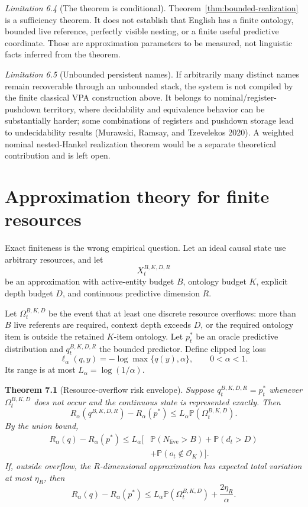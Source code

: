 \documentclass[11pt]{article}
\begin{document}
\emph{Limitation 6.4} (The theorem is conditional). Theorem~\ref{thm:bounded-realization} is a sufficiency theorem. It does not establish that English has a finite ontology, bounded live reference, perfectly visible nesting, or a finite useful predictive coordinate. Those are approximation parameters to be measured, not linguistic facts inferred from the theorem.

\emph{Limitation 6.5} (Unbounded persistent names). If arbitrarily many distinct names remain recoverable through an unbounded stack, the system is not compiled by the finite classical VPA construction above. It belongs to nominal/register-pushdown territory, where decidability and equivalence behavior can be substantially harder; some combinations of registers and pushdown storage lead to undecidability results (Murawski, Ramsay, and Tzevelekos 2020). A weighted nominal nested-Hankel realization theorem would be a separate theoretical contribution and is left open.

\section{Approximation theory for finite resources}\label{approximation-theory-for-finite-resources}

Exact finiteness is the wrong empirical question. Let an ideal causal state use arbitrary resources, and let \[X_t^{B,K,D,R}\] be an approximation with active-entity budget \(B\), ontology budget \(K\), explicit depth budget \(D\), and continuous predictive dimension \(R\).

Let \(\Omega_t^{B,K,D}\) be the event that at least one discrete resource overflows: more than \(B\) live referents are required, context depth exceeds \(D\), or the required ontology item is outside the retained \(K\)-item ontology. Let \(p_t^*\) be an oracle predictive distribution and \(q_t^{B,K,D,R}\) the bounded predictor. Define clipped log loss \[\ell_\alpha(q,y)=-\log\max\{q(y),\alpha\},
\qquad 0<\alpha<1.\] Its range is at most \(L_\alpha=\log(1/\alpha)\).

\label{thm:overflow}
\textbf{Theorem 7.1} (Resource-overflow risk envelope). \emph{Suppose \(q_t^{B,K,D,R}=p_t^*\) whenever \(\Omega_t^{B,K,D}\) does not occur and the continuous state is represented exactly. Then \[R_\alpha(q^{B,K,D,R})-R_\alpha(p^*)
\leq
L_\alpha\mathbb{P}(\Omega_t^{B,K,D}).\] By the union bound, \[\begin{aligned}
R_\alpha(q)-R_\alpha(p^*)
\leq L_\alpha\big[&\mathbb{P}(N_{\mathrm{live}}>B)
+\mathbb{P}(d_t>D)\\
&+\mathbb{P}(o_t\notin\mathcal{O}_K)\big].
\end{aligned}\] If, outside overflow, the \(R\)-dimensional approximation has expected total variation at most \(\eta_R\), then \[R_\alpha(q)-R_\alpha(p^*)
\leq
L_\alpha\mathbb{P}(\Omega_t^{B,K,D})+\frac{2\eta_R}{\alpha}.\]}
\end{document}
